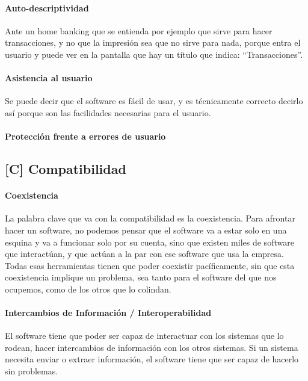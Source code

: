 \paragraph{Auto-descriptividad}
  Ante un home banking que se
  entienda por ejemplo que sirve para hacer transacciones, y no que la
  impresión sea que no sirve para nada, porque entra el usuario y puede
  ver en la pantalla que hay un título que indica: ``Transacciones''.
\paragraph{Asistencia al usuario}
  Se puede decir que el software es fácil de usar, y es técnicamente
  correcto decirlo así porque son las facilidades necesarias para el
  usuario.
\paragraph{Protección frente a errores de usuario}


\hypertarget{compatibilidad-c}{%
\subsection{%
{[}C{]}
Compatibilidad
}\label{compatibilidad-c}}


\hypertarget{coexistencia}{%
\paragraph{Coexistencia}\label{coexistencia}}
La palabra clave que va con la compatibilidad
  es la coexistencia. Para afrontar hacer un software, no podemos pensar
  que el software va a estar solo en una esquina y va a funcionar solo
  por su cuenta, sino que existen miles de software que interactúan, y
  que actúan a la par con ese software que usa la empresa. Todas esas
  herramientas tienen que poder coexistir pacíficamente, sin que esta
  coexistencia implique un problema, sea tanto para el software del que
  nos ocupemos, como de los otros que lo colindan.
\hypertarget{intercambios}{%
\paragraph{Intercambios de Información / Interoperabilidad}\label{intercambios}}
El software tiene que poder ser
  capaz de interactuar con los sistemas que lo rodean, hacer
  intercambios de información con los otros sistemas. Si un sistema
  necesita enviar o extraer información, el software tiene que ser capaz
  de hacerlo sin problemas.


